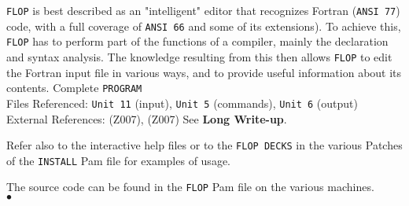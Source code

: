                                
                            
\Submitter{}                                 
{\tt FLOP} is best described as an "intelligent" editor that recognizes
Fortran ({\tt ANSI 77}) code, with a full coverage of
{\tt ANSI 66} and some of its extensions). To achieve this, {\tt FLOP}
has to perform part of the functions of a compiler, mainly the
declaration and syntax analysis.
The knowledge resulting from this then allows {\tt FLOP} to edit the
Fortran input file in various ways, and to provide useful
information about its contents.
\Structure
Complete {\tt PROGRAM}\\
Files  Referenced: {\tt Unit 11} (input), {\tt Unit 5} (commands),
{\tt Unit 6} (output)\\
External References:  (Z007),  (Z007)
\Usage
See {\bf Long Write-up}.
\par
Refer also to the interactive help files or to the {\tt FLOP DECKS}
in the various Patches of the {\tt INSTALL} Pam file for examples of
usage.
\par
The source code can be found in the {\tt FLOP} Pam file on the
various machines.
\\ $\bullet$
